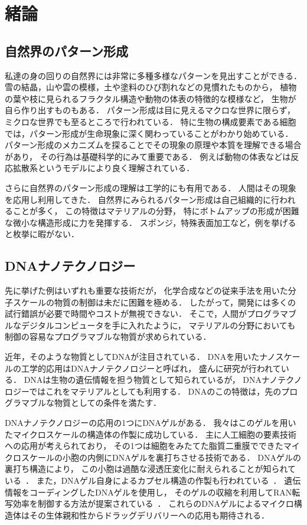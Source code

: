 \chapter{緒論}

\section{自然界のパターン形成}
私達の身の回りの自然界には非常に多種多様なパターンを見出すことができる．
雪の結晶，山や雲の模様，土や塗料のひび割れなどの見慣れたものから，
植物の葉や枝に見られるフラクタル構造や動物の体表の特徴的な模様など，
生物が自ら作り出すものもある．
パターン形成は目に見えるマクロな世界に限らず，
ミクロな世界でも至るところで行われている．
特に生物の構成要素である細胞では，パターン形成が生命現象に深く関わっていることがわかり始めている．
パターン形成のメカニズムを探ることでその現象の原理や本質を理解できる場合があり，
その行為は基礎科学的にみて重要である．
例えば動物の体表などは反応拡散系というモデルにより良く理解されている．

さらに自然界のパターン形成の理解は工学的にも有用である．
人間はその現象を応用し利用してきた． 
自然界にみられるパターン形成は自己組織的に行われることが多く，
この特徴はマテリアルの分野，
特にボトムアップの形成が困難な微小な構造形成に力を発揮する．
スポンジ，特殊表面加工など，例を挙げると枚挙に暇がない．


\section{DNAナノテクノロジー}
先に挙げた例はいずれも重要な技術だが，
化学合成などの従来手法を用いた分子スケールの物質の制御は未だに困難を極める．
したがって，開発には多くの試行錯誤が必要で時間やコストが無視できない．
そこで，人間がプログラマブルなデジタルコンピュータを手に入れたように，
マテリアルの分野においても制御の容易なプログラマブルな物質が求められている．

近年，そのような物質としてDNAが注目されている．
DNAを用いたナノスケールの工学的応用はDNAナノテクノロジーと呼ばれ，
盛んに研究が行われている．
DNAは生物の遺伝情報を担う物質として知られているが，
DNAナノテクノロジーではこれをマテリアルとしても利用する．
DNAのこの特徴は，先のプログラマブルな物質としての条件を満たす．

DNAナノテクノロジーの応用の1つにDNAゲルがある．
我々はこのゲルを用いたマイクロスケールの構造体の作製に成功している．
主に人工細胞の要素技術への応用が考えられており，
その1つは細胞をみたてた脂質二重膜でできたマイクロスケールの小胞の内側にDNAゲルを裏打ちさせる技術である．
DNAゲルの裏打ち構造により，
この小胞は過酷な浸透圧変化に耐えられることが知られている~\cite{kurokawa2017dna}．
また，DNAゲル自身によるカプセル構造の作製も行われている~\cite{morita2017formation}．
遺伝情報をコーディングしたDNAゲルを使用し，
そのゲルの収縮を利用してRAN転写効率を制御する方法が提案されている~\cite{watanabe}．
これらのDNAゲルによるマイクロ構造体はその生体親和性からドラッグデリバリーへの応用も期待される．

